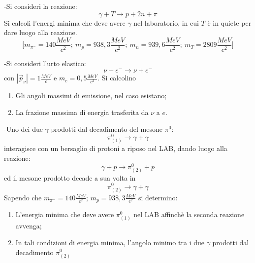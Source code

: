 \documentclass[12pt,twoside,a4]{article}
\begin{document}
\begin{esercizio}
	-Si consideri la reazione:
	\begin{equation*}
		\gamma + T \rightarrow p + 2n + \pi
	\end{equation*}
	Si calcoli l'energi minima che deve avere $\gamma$ nel laboratorio, in cui $T$ è in quiete per dare luogo alla reazione.
	\begin{equation*} 
		\Bigg[ m_{\pi^-}= 140 \frac{MeV}{c^2}; \ m_p= 938,3 \frac{MeV}{c^2}; \ m_n = 939,6 \frac{MeV}{c^2}; \ m_T=2809 \frac{MeV}{c^2} \Bigg]
	\end{equation*}
\end{esercizio}

\begin{esercizio}
	-Si consideri l'urto elastico:
	\begin{equation*}
		\nu + e^- \rightarrow \nu + e^-
	\end{equation*}
	con $|\vec p_\nu |=1 \frac{MeV}{c}$ e $m_e=0,5 \frac{MeV}{c^2}$. Si calcolino
	\begin{enumerate}[label=(\textit{\roman*})]
		\item Gli angoli massimi di emissione, nel caso esistano;
		\item La frazione massima di energia trasferita da $\nu$ a $e$.
	\end{enumerate}
\end{esercizio}

\begin{esercizio}
	-Uno dei due $\gamma$ prodotti dal decadimento del mesone $\pi^0$:
	\begin{equation*}
		\pi^0_{(1)} \rightarrow \gamma + \gamma
	\end{equation*}
	interagisce con un bersaglio di protoni a riposo nel LAB, dando luogo alla reazione:
	\begin{equation*}
		\gamma + p \rightarrow \pi^0 _{(2)} + p
	\end{equation*}
	ed il mesone prodotto decade a sua volta in 
	\begin{equation*}
		\pi^0_{(2)} \rightarrow \gamma + \gamma
	\end{equation*}
	Sapendo che $m_{\pi^-}= 140 \frac{MeV}{c^2}$; $m_p= 938,3 \frac{MeV}{c^2}$ si determino:
	\begin{enumerate}[label=(\textit{\roman*})]
		\item L'energia minima che deve avere $\pi^0_{(1)}$ nel LAB affinchè la seconda reazione avvenga;
		\item In tali condizioni di energia minima, l'angolo minimo tra i due $\gamma$ prodotti dal decadimento $\pi^0_{(2)}$
	\end{enumerate}
\end{esercizio}
\end{document}
